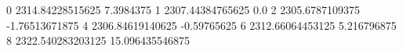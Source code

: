0 2314.84228515625 7.3984375
1 2307.44384765625 0.0
2 2305.6787109375 -1.76513671875
4 2306.84619140625 -0.59765625
6 2312.66064453125 5.216796875
8 2322.540283203125 15.096435546875
